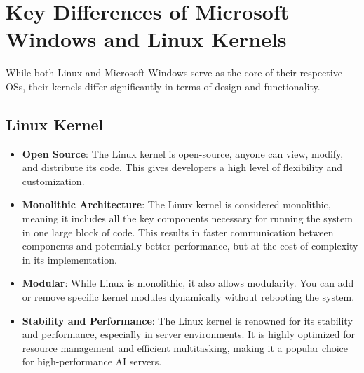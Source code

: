 \section{Key Differences of Microsoft Windows and Linux Kernels}
While both Linux and Microsoft Windows serve as the core of their respective OSs, their kernels differ significantly in terms of design and functionality.

\subsection{Linux Kernel}
\begin{itemize}
    \item \textbf{Open Source}: The Linux kernel is open-source, anyone can view, modify, and distribute its code. This gives developers a high level of flexibility and customization.
    \item \textbf{Monolithic Architecture}: The Linux kernel is considered monolithic, meaning it includes all the key components necessary for running the system in one large block of code. This results in faster communication between components and potentially better performance, but at the cost of complexity in its implementation.
    \item \textbf{Modular}: While Linux is monolithic, it also allows modularity. You can add or remove specific kernel modules dynamically without rebooting the system.
    \item \textbf{Stability and Performance}: The Linux kernel is renowned for its stability and performance, especially in server environments. It is highly optimized for resource management and efficient multitasking, making it a popular choice for high-performance AI servers.
\end{itemize}

